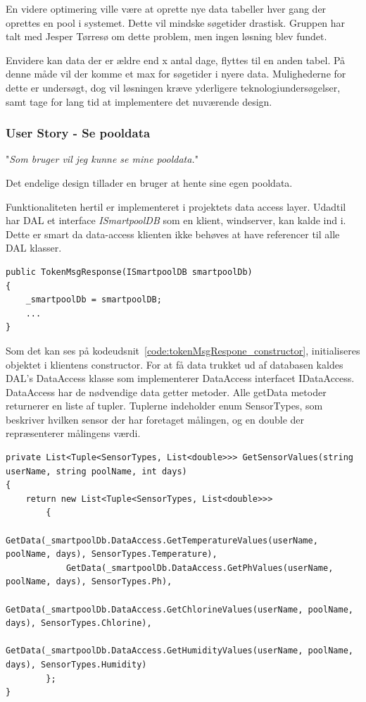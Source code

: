 En videre optimering ville være at oprette nye data tabeller hver gang der oprettes en pool i systemet. Dette vil mindske søgetider drastisk. Gruppen har talt med Jesper Tørresø om dette problem, men ingen løsning blev fundet.

Envidere kan data der er ældre end x antal dage, flyttes til en anden tabel. På denne måde vil der komme et max for søgetider i nyere data.
Mulighederne for dette er undersøgt, dog vil løsningen kræve yderligere teknologiundersøgelser, samt tage for lang tid at implementere det nuværende design.

\subsubsection{User Story - Se pooldata}

"\textit{Som bruger vil jeg kunne se mine pooldata.}"

Det endelige design tillader en bruger at hente sine egen pooldata.

Funktionaliteten hertil er implementeret i projektets data access layer. Udadtil har DAL et interface \textit{ISmartpoolDB} som en klient, \gls{windserver}, kan kalde ind i. Dette er smart da data-access klienten ikke behøves at have referencer til alle DAL klasser.

\begin{lstlisting}[caption=TokenMsgResponse constructor,label=code:tokenMsgRespone_constructor]
public TokenMsgResponse(ISmartpoolDB smartpoolDb)
{
	_smartpoolDb = smartpoolDB;
	...
}
\end{lstlisting}

Som det kan ses på kodeudsnit~\ref{code:tokenMsgRespone_constructor}, initialiseres objektet i klientens constructor.
For at få data trukket ud af databasen kaldes DAL's DataAccess klasse som implementerer DataAccess interfacet IDataAccess. DataAccess har de nødvendige data getter metoder. 
Alle getData metoder returnerer en liste af tupler. Tuplerne indeholder enum SensorTypes, som beskriver hvilken sensor der har foretaget målingen, og en double der repræsenterer målingens værdi.

\begin{lstlisting}[caption=something, label=code:derp]
private List<Tuple<SensorTypes, List<double>>> GetSensorValues(string userName, string poolName, int days)
{
	return new List<Tuple<SensorTypes, List<double>>>
		{
			GetData(_smartpoolDb.DataAccess.GetTemperatureValues(userName, poolName, days), SensorTypes.Temperature),
			GetData(_smartpoolDb.DataAccess.GetPhValues(userName, poolName, days), SensorTypes.Ph),
			GetData(_smartpoolDb.DataAccess.GetChlorineValues(userName, poolName, days), SensorTypes.Chlorine),
			GetData(_smartpoolDb.DataAccess.GetHumidityValues(userName, poolName, days), SensorTypes.Humidity)
		};
}
\end{lstlisting}

